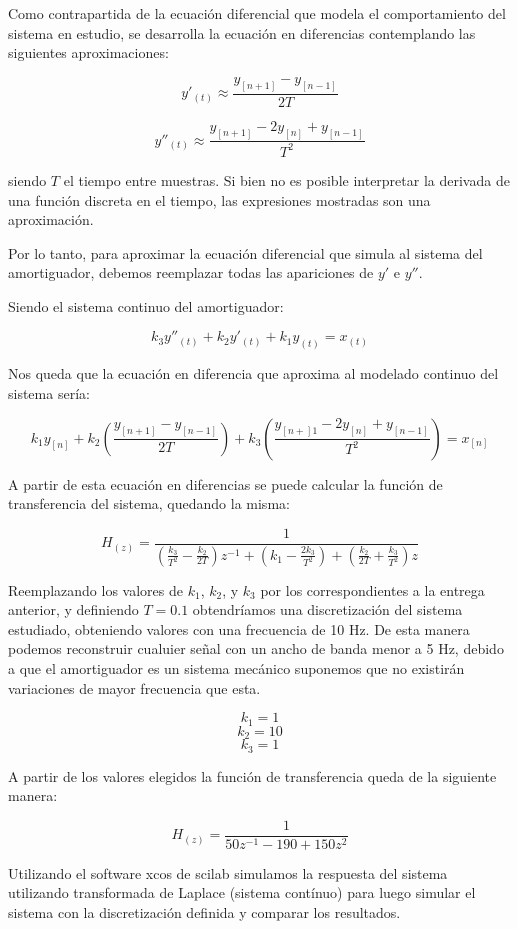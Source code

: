 \documentclass{article}
\begin{document}
Como contrapartida de la ecuación diferencial que modela el comportamiento del sistema en estudio, se desarrolla la ecuación en diferencias contemplando las siguientes aproximaciones:

$$y'_{(t)} \approx \frac{y_{[n+1]}-y_{[n-1]}}{2T}$$

$$y''_{(t)} \approx \frac{y_{[n+1]} - 2 y_{[n]} + y_{[n-1]}}{T^2}$$

siendo $T$ el tiempo entre muestras. Si bien no es posible interpretar la derivada de una función discreta en el tiempo, las expresiones mostradas son una aproximación.


Por lo tanto, para aproximar la ecuación diferencial que simula al sistema del amortiguador, debemos reemplazar todas las apariciones de $y'$ e $y''$.

Siendo el sistema continuo del amortiguador:

$$k_3 y''_{(t)} + k_2 y'_{(t)} + k_1 y_{(t)} = x_{(t)}$$

Nos queda que la ecuación en diferencia que aproxima al modelado continuo del sistema sería:

$$k_1 y_{[n]} + k_2 \left(\frac{y_{[n+1]}-y_{[n-1]}}{2T}\right) + k_3 \left(\frac{y_{[n+]1} - 2 y_{[n]} + y_{[n-1]}}{T^2}\right)= x_{[n]}$$

A partir de esta ecuación en diferencias se puede calcular la función de transferencia del sistema, quedando la misma:

$$H_{(z)} = \frac{1}{\left(\frac{k_3}{T^2} - \frac{k_2}{2T}\right) z^{-1} + \left(k_1-\frac{2k_3}{T^2}\right) + \left(\frac{k_2}{2T} + \frac{k_3}{T^2}\right) z} $$


Reemplazando los valores de $k_1$, $k_2$, y $k_3$ por los correspondientes a la entrega anterior, y definiendo $T=0.1$ obtendríamos una discretización del sistema estudiado, obteniendo valores con una frecuencia de 10 Hz. De esta manera podemos reconstruir cualuier señal con un ancho de banda menor a 5 Hz, debido a que el amortiguador es un sistema mecánico suponemos que  no existirán variaciones de mayor frecuencia que esta.

$$ k_1 =1$$
$$k_2 =10$$
$$k_3=1$$

A partir de los valores elegidos la función de transferencia queda de la siguiente manera:

$$H_{(z)} = \frac{1}{50 z^{-1} - 190 + 150 z^{2}}$$

Utilizando el software xcos de scilab simulamos la respuesta del sistema utilizando transformada de Laplace (sistema contínuo) para luego simular el sistema con la discretización definida y comparar los resultados.
\end{document}

